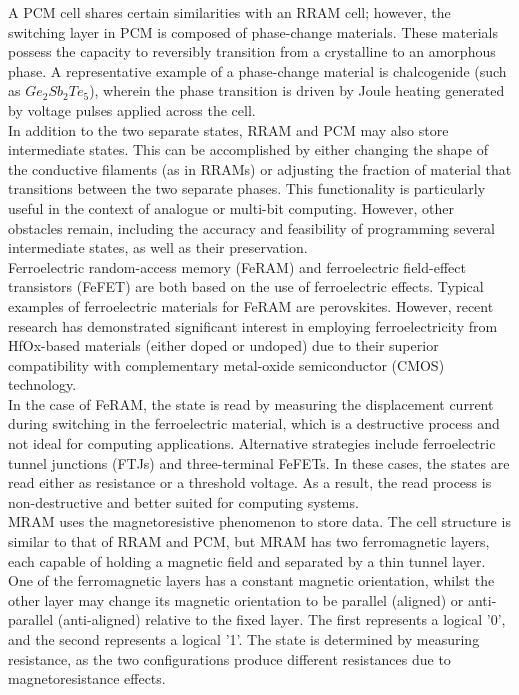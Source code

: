 \noindent A PCM cell shares certain similarities with an RRAM cell; however, the switching layer in PCM is composed of phase-change materials. These materials possess the capacity to reversibly transition from a crystalline to an amorphous phase. A representative example of a phase-change material is chalcogenide (such as $Ge_2 Sb_2 Te_5$), wherein the phase transition is driven by Joule heating generated by voltage pulses applied across the cell. \\

\noindent In addition to the two separate states, RRAM and PCM may also store intermediate states. This can be accomplished by either changing the shape of the conductive filaments (as in RRAMs) or adjusting the fraction of material that transitions between the two separate phases. This functionality is particularly useful in the context of analogue or multi-bit computing. However, other obstacles remain, including the accuracy and feasibility of programming several intermediate states, as well as their preservation. \\

\noindent Ferroelectric random-access memory (FeRAM) and ferroelectric field-effect transistors (FeFET) are both based on the use of ferroelectric effects. Typical examples of ferroelectric materials for FeRAM are perovskites. However, recent research has demonstrated significant interest in employing ferroelectricity from HfOx-based materials \cite{mulaosmanovic2021ferroelectric} (either doped or undoped) due to their superior compatibility with complementary metal-oxide semiconductor (CMOS) technology. \\

\noindent In the case of FeRAM, the state is read by measuring the displacement current during switching in the ferroelectric material, which is a destructive process and not ideal for computing applications. Alternative strategies include ferroelectric tunnel junctions (FTJs) and three-terminal FeFETs. In these cases, the states are read either as resistance or a threshold voltage. As a result, the read process is non-destructive and better suited for computing systems. \\

\noindent MRAM uses the magnetoresistive phenomenon to store data. The cell structure is similar to that of RRAM and PCM, but MRAM has two ferromagnetic layers, each capable of holding a magnetic field and separated by a thin tunnel layer. One of the ferromagnetic layers has a constant magnetic orientation, whilst the other layer may change its magnetic orientation to be parallel (aligned) or anti-parallel (anti-aligned) relative to the fixed layer. The first represents a logical '0', and the second represents a logical '1'. The state is determined by measuring resistance, as the two configurations produce different resistances due to magnetoresistance effects. \\

